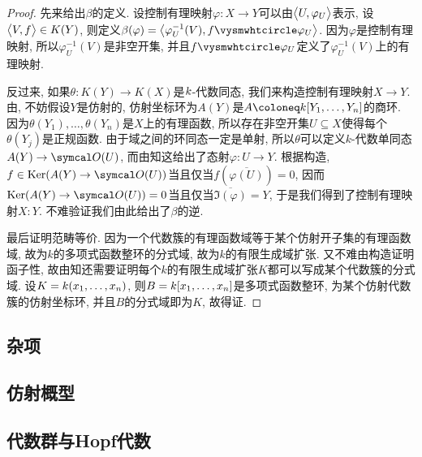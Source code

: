 \begin{proof}
  先来给出$\beta$的定义. 设控制有理映射$\varphi\colon X\to Y$可以由$\lrbig<>{U, \varphi_U}$表示, 设$\lrbig<>{V, f}\in K(Y)$, 则定义$\beta(\varphi)=\lrbig<>{\varphi_{U}^{-1}(V), f\composite \varphi_U}$. 因为$\varphi$是控制有理映射, 所以$\varphi_{U}^{-1}(V)$是非空开集, 并且$f\composite \varphi_U$定义了$\varphi_{U}^{-1}(V)$上的有理映射.

  反过来, 如果$\theta\colon K(Y)\to K(X)$是$\kk$-代数同态, 我们来构造控制有理映射$X\to Y$. 由, 不妨假设$Y$是仿射的, 仿射坐标环为$A(Y)$是$A\coloneq \kk [Y_1, \dotsc, Y_n]$的商环. 因为$\theta(Y_1), \dotsc, \theta(Y_n)$是$X$上的有理函数, 所以存在非空开集$U\subseteq X$使得每个$\theta(Y_j)$是正规函数. 由于域之间的环同态一定是单射, 所以$\theta$可以定义$k$-代数单同态$A(Y)\to \OO (U)$, 而由知这给出了态射$\varphi\colon U\to Y$. 根据构造, $f\in\Ker (A(Y)\to \OO (U))$当且仅当$f(\overline{\varphi (U)})=0$, 因而$\Ker (A(Y)\to \OO (U))=0$当且仅当$\overline{\Im (\varphi)}=Y$, 于是我们得到了控制有理映射$X\colon Y$. 不难验证我们由此给出了$\beta$的逆.

  最后证明范畴等价. 因为一个代数簇的有理函数域等于某个仿射开子集的有理函数域, 故为$k$的多项式函数整环的分式域, 故为$k$的有限生成域扩张. 又不难由构造证明函子性, 故由知还需要证明每个$k$的有限生成域扩张$K$都可以写成某个代数簇的分式域. 设$K=\kk (x_1, \dotsc, x_n)$, 则$B=\kk [x_1, \dotsc, x_n]$是多项式函数整环, 为某个仿射代数簇的仿射坐标环, 并且$B$的分式域即为$K$, 故得证.
\end{proof}

\subsection{杂项}


\subsection{仿射概型}\label{subsec:ag-affinescheme}


\subsection{代数群与Hopf代数}

